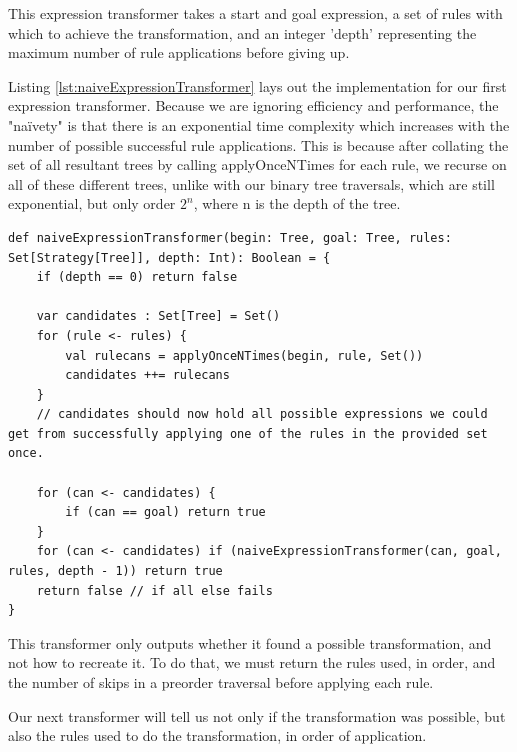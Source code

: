 \documentclass{l4proj}
\begin{document}
This expression transformer takes a start and goal expression, a set of rules with which to achieve the transformation, and an integer 'depth' representing the maximum number of rule applications before giving up.

 
Listing \ref{lst:naiveExpressionTransformer} lays out the implementation for our first expression transformer. Because we are ignoring efficiency and performance, the "naïvety" is that there is an exponential time complexity which increases with the number of possible successful rule applications. This is because after collating the set of all resultant trees by calling applyOnceNTimes for each rule, we recurse on all of these different trees, unlike with our binary tree traversals, which are still exponential, but only order $2^n$, where n is the depth of the tree.


\begin{lstlisting}[caption={The first and simplest expression transformer}, label={lst:naiveExpressionTransformer}]
def naiveExpressionTransformer(begin: Tree, goal: Tree, rules: Set[Strategy[Tree]], depth: Int): Boolean = {
    if (depth == 0) return false
    
    var candidates : Set[Tree] = Set()
    for (rule <- rules) {
        val rulecans = applyOnceNTimes(begin, rule, Set())
        candidates ++= rulecans
    }
    // candidates should now hold all possible expressions we could get from successfully applying one of the rules in the provided set once.
    
    for (can <- candidates) {
        if (can == goal) return true
    }
    for (can <- candidates) if (naiveExpressionTransformer(can, goal, rules, depth - 1)) return true
    return false // if all else fails
}
\end{lstlisting}


This transformer only outputs whether it found a possible transformation, and not how to recreate it. To do that, we must return the rules used, in order, and the number of skips in a preorder traversal before applying each rule.






Our next transformer will tell us not only if the transformation was possible, but also the rules used to do the transformation, in order of application.
\end{document}
